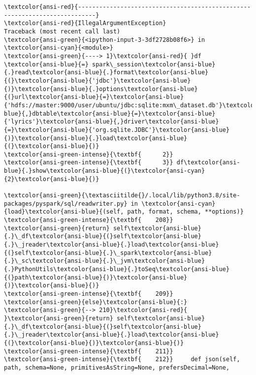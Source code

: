 \documentclass[11pt]{article}
\begin{document}
    \begin{Verbatim}[commandchars=\\\{\}, frame=single, framerule=2mm, rulecolor=\color{outerrorbackground}]
\textcolor{ansi-red}{---------------------------------------------------------------------------}
\textcolor{ansi-red}{IllegalArgumentException}                  Traceback (most recent call last)
\textcolor{ansi-green}{<ipython-input-3-3df2728b08f6>} in \textcolor{ansi-cyan}{<module>}
\textcolor{ansi-green}{----> 1}\textcolor{ansi-red}{ }df \textcolor{ansi-blue}{=} spark\_session\textcolor{ansi-blue}{.}read\textcolor{ansi-blue}{.}format\textcolor{ansi-blue}{(}\textcolor{ansi-blue}{'jdbc'}\textcolor{ansi-blue}{)}\textcolor{ansi-blue}{.}options\textcolor{ansi-blue}{(}url\textcolor{ansi-blue}{=}\textcolor{ansi-blue}{'hdfs://master:9000/user/ubuntu/jdbc:sqlite:mxm\_dataset.db'}\textcolor{ansi-blue}{,}dbtable\textcolor{ansi-blue}{=}\textcolor{ansi-blue}{'lyrics'}\textcolor{ansi-blue}{,}driver\textcolor{ansi-blue}{=}\textcolor{ansi-blue}{'org.sqlite.JDBC'}\textcolor{ansi-blue}{)}\textcolor{ansi-blue}{.}load\textcolor{ansi-blue}{(}\textcolor{ansi-blue}{)}
\textcolor{ansi-green-intense}{\textbf{      2}} 
\textcolor{ansi-green-intense}{\textbf{      3}} df\textcolor{ansi-blue}{.}show\textcolor{ansi-blue}{(}\textcolor{ansi-cyan}{2}\textcolor{ansi-blue}{)}

\textcolor{ansi-green}{\textasciitilde{}/.local/lib/python3.8/site-packages/pyspark/sql/readwriter.py} in \textcolor{ansi-cyan}{load}\textcolor{ansi-blue}{(self, path, format, schema, **options)}
\textcolor{ansi-green-intense}{\textbf{    208}}             \textcolor{ansi-green}{return} self\textcolor{ansi-blue}{.}\_df\textcolor{ansi-blue}{(}self\textcolor{ansi-blue}{.}\_jreader\textcolor{ansi-blue}{.}load\textcolor{ansi-blue}{(}self\textcolor{ansi-blue}{.}\_spark\textcolor{ansi-blue}{.}\_sc\textcolor{ansi-blue}{.}\_jvm\textcolor{ansi-blue}{.}PythonUtils\textcolor{ansi-blue}{.}toSeq\textcolor{ansi-blue}{(}path\textcolor{ansi-blue}{)}\textcolor{ansi-blue}{)}\textcolor{ansi-blue}{)}
\textcolor{ansi-green-intense}{\textbf{    209}}         \textcolor{ansi-green}{else}\textcolor{ansi-blue}{:}
\textcolor{ansi-green}{--> 210}\textcolor{ansi-red}{             }\textcolor{ansi-green}{return} self\textcolor{ansi-blue}{.}\_df\textcolor{ansi-blue}{(}self\textcolor{ansi-blue}{.}\_jreader\textcolor{ansi-blue}{.}load\textcolor{ansi-blue}{(}\textcolor{ansi-blue}{)}\textcolor{ansi-blue}{)}
\textcolor{ansi-green-intense}{\textbf{    211}} 
\textcolor{ansi-green-intense}{\textbf{    212}}     def json(self, path, schema=None, primitivesAsString=None, prefersDecimal=None,


\end{Verbatim}
\end{document}
